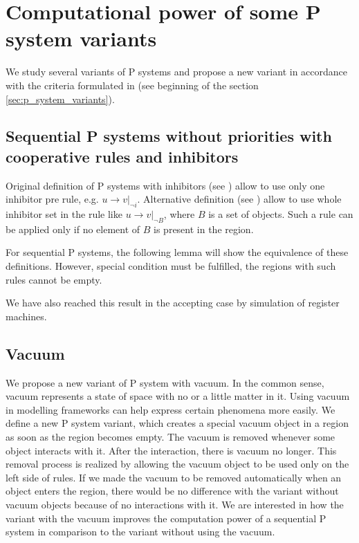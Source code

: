 \chapter{Computational power of some P system variants} %
\label{cha:computational_power_of_some_p_system_variants}

We study several variants of P systems and propose a new variant in accordance with the criteria formulated in \cite{Besozzi:PhD:2004} (see beginning of the section \ref{sec:p_system_variants}).

\section{Sequential P systems without priorities with cooperative rules and inhibitors} %
\label{sec:sequential_p_systems_without_priorities_with_cooperative_rules_and_inhibitors}

Original definition of P systems with inhibitors (see \cite{Ionescu:jucs_10_5:on_p_systems_with}) allow to use only one inhibitor pre rule, e.g. $u\rightarrow v|_{\neg i}$. Alternative definition (see \cite{Agrigoroaiei:2010:Dissolution}) allow to use whole inhibitor set in the rule like $u\rightarrow v|_{\neg B}$, where $B$ is a set of objects. Such a rule can be applied only if no element of $B$ is present in the region.

For sequential P systems, the following lemma will show the equivalence of these definitions. However, special condition must be fulfilled, the regions with such rules cannot be empty.



We have also reached this result in the accepting case by simulation of register machines.




\section{Vacuum} %
\label{sec:vacuum}

We propose a new variant of P system with vacuum. In the common sense, vacuum represents a state of space with no or a little matter in it. Using vacuum in modelling frameworks can help express certain phenomena more easily. We define a new P system variant, which creates a special vacuum object in a region as soon as the region becomes empty. The vacuum is removed whenever some object interacts with it. After the interaction, there is vacuum no longer. This removal process is realized by allowing the vacuum object to be used only on the left side of rules. If we made the vacuum to be removed automatically when an object enters the region, there would be no difference with the variant without vacuum objects because of no interactions with it.
We are interested in how the variant with the vacuum improves the computation power of a sequential P system in comparison to the variant without using the vacuum.




